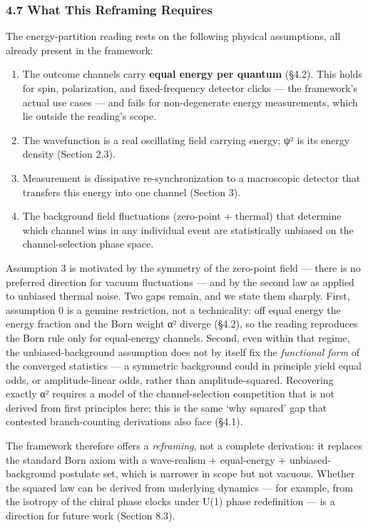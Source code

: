 \documentclass[
]{article}
\providecommand{\tightlist}{%
  \setlength{\itemsep}{0pt}\setlength{\parskip}{0pt}}
\begin{document}
\subsubsection{4.7 What This Reframing
Requires}\label{what-this-reframing-requires}

The energy-partition reading rests on the following physical
assumptions, all already present in the framework:

\begin{enumerate}
\def\labelenumi{\arabic{enumi}.}
\setcounter{enumi}{-1}
\tightlist
\item
  The outcome channels carry \textbf{equal energy per quantum} (§4.2).
  This holds for spin, polarization, and fixed-frequency detector clicks
  --- the framework's actual use cases --- and fails for non-degenerate
  energy measurements, which lie outside the reading's scope.
\item
  The wavefunction is a real oscillating field carrying energy;
  \textbar ψ\textbar² is its energy density (Section 2.3).
\item
  Measurement is dissipative re-synchronization to a macroscopic
  detector that transfers this energy into one channel (Section 3).
\item
  The background field fluctuations (zero-point + thermal) that
  determine which channel wins in any individual event are statistically
  unbiased on the channel-selection phase space.
\end{enumerate}

Assumption 3 is motivated by the symmetry of the zero-point field ---
there is no preferred direction for vacuum fluctuations --- and by the
second law as applied to unbiased thermal noise. Two gaps remain, and we
state them sharply. First, assumption 0 is a genuine restriction, not a
technicality: off equal energy the energy fraction and the Born weight
\textbar α\textbar² diverge (§4.2), so the reading reproduces the Born
rule only for equal-energy channels. Second, even within that regime,
the unbiased-background assumption does not by itself fix the
\emph{functional form} of the converged statistics --- a symmetric
background could in principle yield equal odds, or amplitude-linear
odds, rather than amplitude-squared. Recovering exactly
\textbar α\textbar² requires a model of the channel-selection
competition that is not derived from first principles here; this is the
same `why squared' gap that contested branch-counting derivations also
face (§4.1).

The framework therefore offers a \emph{reframing}, not a complete
derivation: it replaces the standard Born axiom with a wave-realism +
equal-energy + unbiased-background postulate set, which is narrower in
scope but not vacuous. Whether the squared law can be derived from
underlying dynamics --- for example, from the isotropy of the chiral
phase clocks under U(1) phase redefinition --- is a direction for future
work (Section 8.3).
\end{document}
